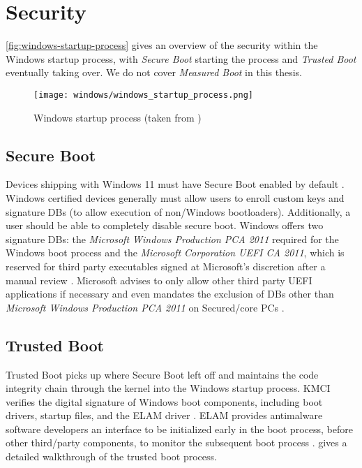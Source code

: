 
\section{Security}

\autoref{fig:windows-startup-process} gives an overview of the security within the Windows startup process, with \emph{Secure Boot} starting the process and \emph{Trusted Boot} eventually taking over.
We do not cover \emph{Measured Boot} in this thesis.

\begin{figure}[phtb]
    \centering
    \texttt{[image: windows/windows\_startup\_process.png]}
    \caption[Windows startup process]{Windows startup process (taken from \cite{microsoft-secure-the-windows-boot-process})}
    \label{fig:windows-startup-process}
\end{figure}

\subsection{Secure Boot}
Devices shipping with Windows 11 must have Secure Boot enabled by default \cite{microsoft-windows-minimum-hardware-requirements-overview}.
Windows certified devices generally must allow users to enroll custom keys and signature \acp{DB} (to allow execution of non\-/Windows bootloaders).
Additionally, a user should be able to completely disable secure boot.
Windows offers two signature \acp{DB}: the \emph{Microsoft Windows Production PCA 2011} required for the Windows boot process and the \emph{Microsoft Corporation \ac{UEFI} \ac{CA} 2011}, which is reserved for third party executables signed at Microsoft's discretion after a manual review \cite{microsoft-uefi-signing}.
Microsoft advises to only allow other third party \ac{UEFI} applications if necessary and even mandates the exclusion of \acp{DB} other than \emph{Microsoft Windows Production PCA 2011} on Secured\-/core \acp{PC} \cite{microsoft-secure-the-windows-boot-process}.

\subsection{Trusted Boot}
Trusted Boot picks up where Secure Boot left off and maintains the code integrity chain through the kernel into the Windows startup process.
\ac{KMCI} verifies the digital signature of Windows boot components, including boot drivers, startup files, and the \ac{ELAM} driver \cite{microsoft-trusted-boot}.
\ac{ELAM} provides antimalware software developers an interface to be initialized early in the boot process, before other third\-/party components, to monitor the subsequent boot process \cite{micosoft-windows-elam}.
\cite{understanding-windows-trusted-boot} gives a detailed walkthrough of the trusted boot process.

